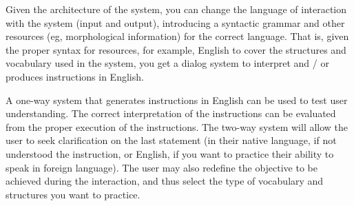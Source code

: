 
Given the architecture of the system, you can change the language of interaction
with the system (input and output), introducing a syntactic grammar and other
resources (eg, morphological information) for the correct language. That is,
given the proper syntax for resources, for example, English to cover the
structures and vocabulary used in the system, you get a dialog system to
interpret and / or produces instructions in English.


A one-way system that generates instructions in English can be used to test user
understanding. The correct interpretation of the instructions can be evaluated
from the proper execution of the instructions. The two-way system will allow the
user to seek clarification on the last statement (in their native language, if
not understood the instruction, or English, if you want to practice their
ability to speak in foreign language). The user may also redefine the objective
to be achieved during the interaction, and thus select the type of vocabulary
and structures you want to practice.

